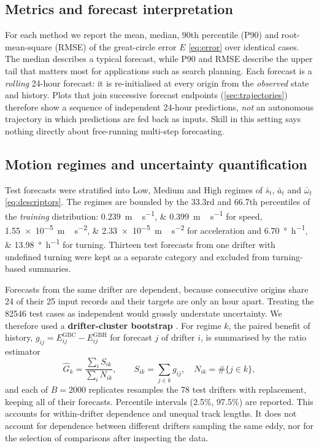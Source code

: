 \subsection{Metrics and forecast interpretation}
For each method we report the mean, median, 90th percentile (P90) and root-mean-square (RMSE) of the great-circle error $E$ \eqref{eq:error} over identical cases. The median describes a typical forecast, while P90 and RMSE describe the upper tail that matters most for applications such as search planning. Each forecast is a \emph{rolling} 24-hour forecast: it is re-initialised at every origin from the \emph{observed} state and history. Plots that join successive forecast endpoints (\cref{sec:trajectories}) therefore show a sequence of independent 24-hour predictions, \emph{not} an autonomous trajectory in which predictions are fed back as inputs. Skill in this setting says nothing directly about free-running multi-step forecasting.

\subsection{Motion regimes and uncertainty quantification}\label{sec:bootstrap}
Test forecasts were stratified into Low, Medium and High regimes of $\bar s_t$, $\bar a_t$ and $\bar\omega_t$ \eqref{eq:descriptors}. The regimes are bounded by the 33.3rd and 66.7th percentiles of the \emph{training} distribution: \SIlist{0.239;0.399}{m\,s^{-1}} for speed, \SIlist{1.55e-5;2.33e-5}{m\,s^{-2}} for acceleration and \SIlist{6.70;13.98}{\degree\per\hour} for turning. Thirteen test forecasts from one drifter with undefined turning were kept as a separate category and excluded from turning-based summaries.

Forecasts from the same drifter are dependent, because consecutive origins share 24 of their 25 input records and their targets are only an hour apart. Treating the \num{82546} test cases as independent would grossly understate uncertainty. We therefore used a \textbf{drifter-cluster bootstrap} \citep{efron1993,cameron2008}. For regime $k$, the paired benefit of history, $g_{ij}=E^{\mathrm{GBC}}_{ij}-E^{\mathrm{GBH}}_{ij}$ for forecast $j$ of drifter $i$, is summarised by the ratio estimator
\begin{equation}
\hat G_k=\frac{\sum_i S_{ik}}{\sum_i N_{ik}},\qquad S_{ik}=\sum_{j\in k} g_{ij},\quad N_{ik}=\#\{j\in k\},
\end{equation}
and each of $B=2000$ replicates resamples the 78 test drifters with replacement, keeping all of their forecasts. Percentile intervals (2.5\%, 97.5\%) are reported. This accounts for within-drifter dependence and unequal track lengths. It does not account for dependence between different drifters sampling the same eddy, nor for the selection of comparisons after inspecting the data.
